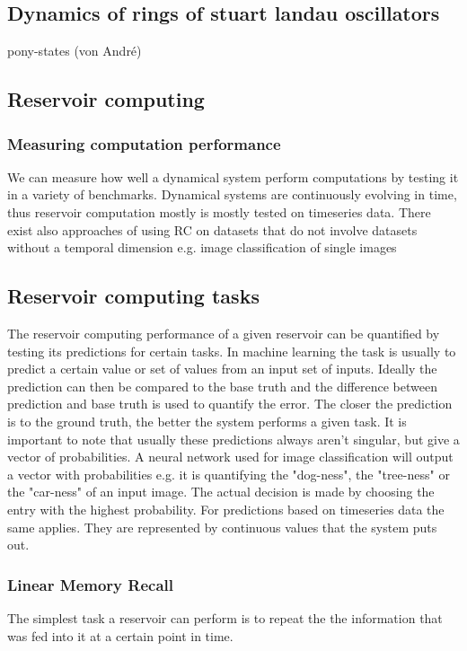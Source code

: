	

\subsection{Dynamics of rings of stuart landau oscillators}
	pony-states (von André)
	
\subsection{Reservoir computing}
	
	\subsubsection{Measuring computation performance}
	We can measure how well a dynamical system perform computations by testing it in a variety of benchmarks. Dynamical systems are continuously evolving in time, thus reservoir computation mostly is mostly tested on timeseries data. There exist also approaches of using RC on datasets that do not involve datasets without a temporal dimension e.g. image classification of single images \cite{}
	
	
	
	
\subsection{Reservoir computing tasks}
	The reservoir computing performance of a given reservoir can be quantified by testing its predictions for certain tasks. In machine learning the task is usually to predict a certain value or set of values from an input set of inputs. Ideally the prediction can then be compared to the base truth and the difference between prediction and base truth is used to quantify the error. The closer the prediction is to the ground truth, the better the system 
	performs a given task. It is important to note that usually these predictions always aren't singular, but give a vector of probabilities. A neural network used for image classification will output a vector with probabilities e.g. it is quantifying the "dog-ness", the "tree-ness" or the "car-ness" of an input image. The actual decision is made by choosing the entry with the highest probability. 
	For predictions based on timeseries data the same applies. They are represented by continuous values that the system puts out.  
	

	

\subsubsection{Linear Memory Recall}
	The simplest task a reservoir can perform is to repeat the the information that was fed into it at a certain point in time.  



